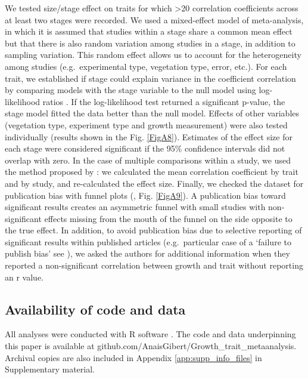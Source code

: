 \documentclass[a4paper]{article}\usepackage[]{graphicx}\usepackage[]{color}
\begin{document}
We tested size/stage effect on traits for which \textgreater{}20 correlation coefficients across at least two stages were recorded. We used a mixed-effect model of meta-analysis, in which it is assumed that studies within a stage share a common mean effect but that there is also random variation among studies in a stage, in addition to sampling variation. This random effect allows us to account for the heterogeneity among studies (e.g.~experimental type, vegetation type, error, etc.). For each trait, we established if stage could explain variance in the coefficient correlation by comparing models with the stage variable to the null model using log-likelihood ratios \citep{Zuur:2009cfa}. If the log-likelihood test returned a significant p-value, the stage model fitted the data better than the null model. Effects of other variables (vegetation type, experiment type and growth measurement) were also tested individually (results shown in the Fig. \ref{FigA8}). Estimates of the effect size for each stage were considered significant if the 95\% confidence intervals did not overlap with zero. In the case of multiple comparisons within a study, we used the method proposed by \citet{Borenstein:2009um}: we calculated the mean correlation coefficient by trait and by study, and re-calculated the effect size. Finally, we checked the dataset for publication bias with funnel plots (\citealt{Koricheva:2013tz}, Fig. \ref{FigA9}). A publication bias toward significant results creates an asymmetric funnel with small studies with non-significant effects missing from the mouth of the funnel on the side opposite to the true effect. In addition, to avoid publication bias due to selective reporting of significant results within published articles (e.g.~particular case of a `failure to publish bias' see \citealt{Jennions:2013ta}), we asked the authors for additional information when they reported a non-significant correlation between growth and trait without reporting an r value.

\subsection*{Availability of code and data}\label{code}

All analyses were conducted with R software \citep{Ralanguageanden:2014wf}. The code and data underpinning this paper is available at github.com/AnaisGibert/Growth\_trait\_metaanalysis. Archival copies are also included in Appendix \ref{app:supp_info_files} in Supplementary material.
\end{document}
